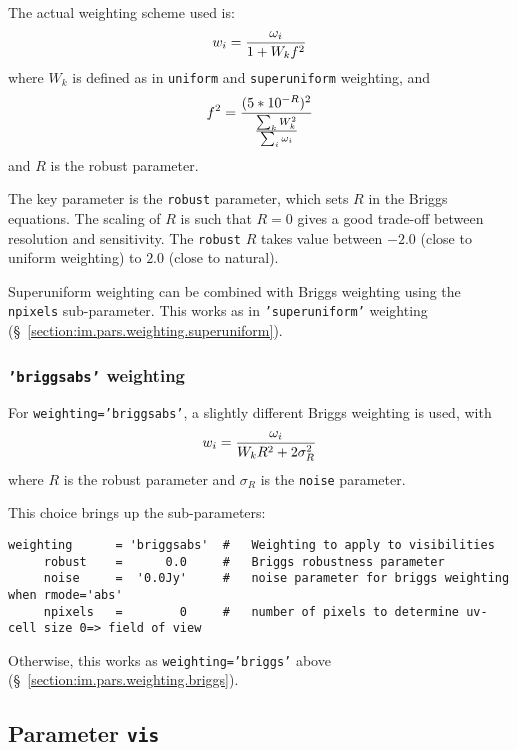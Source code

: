 The actual weighting scheme used is:
\begin{equation}
   w_i={\omega_i\over{1 + W_k f^2}}
\end{equation}
where $W_k$ is defined as in {\tt uniform} and {\tt superuniform}
weighting, and
\begin{equation}
   f^2={{(5*10^{-R})^2}\over{{\sum_k W_k^2}\over{\sum_i \omega_i}}}
\end{equation}
and $R$ is the robust parameter. 

The key parameter is the {\tt robust} parameter, which sets $R$ in the
Briggs equations.  The scaling of $R$ is such that $R = 0$ gives a
good trade-off between resolution and sensitivity. The {\tt robust}
$R$ takes value between $-2.0$ (close to uniform weighting) 
to $2.0$ (close to natural).

Superuniform weighting can be combined with Briggs weighting
using the {\tt npixels} sub-parameter.  This works as in 
{\tt 'superuniform'} weighting 
(\S~\ref{section:im.pars.weighting.superuniform}).

\subsubsection{{\tt 'briggsabs'} weighting }
\label{section:im.pars.weighting.briggsabs}

For {\tt weighting='briggsabs'}, a slightly different Briggs weighting is used,
with
\begin{equation}
  w_i={\omega_i\over{W_k R^2 + 2 \sigma_R^2}}
\end{equation}
where $R$ is the robust parameter and $\sigma_R$ is the {\tt noise}
parameter. 

This choice brings up the sub-parameters:
\small
\begin{verbatim}
weighting      = 'briggsabs'  #   Weighting to apply to visibilities 
     robust    =      0.0     #   Briggs robustness parameter
     noise     =  '0.0Jy'     #   noise parameter for briggs weighting when rmode='abs'
     npixels   =        0     #   number of pixels to determine uv-cell size 0=> field of view
\end{verbatim}
\normalsize

Otherwise, this works as {\tt weighting='briggs'} above 
(\S~\ref{section:im.pars.weighting.briggs}).

\subsection{Parameter {\tt vis} }
\label{section:im.pars.vis}

